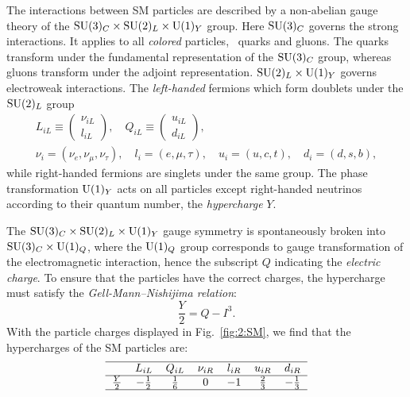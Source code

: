 The interactions between \acs{SM} particles are described by a non-abelian gauge theory of the $\mathrm{SU}(3)_C \times \mathrm{SU}(2)_L \times \mathrm{U}(1)_Y$ group. Here $\mathrm{SU}(3)_C$ governs the strong interactions. It applies to all \textit{colored} particles, \ie~quarks and gluons. The quarks transform under the fundamental representation of the $\mathrm{SU}(3)_C$ group, whereas gluons transform under the adjoint representation. $\mathrm{SU}(2)_L \times \mathrm{U}(1)_Y$ governs electroweak interactions. The \textit{left-handed} fermions which form doublets under the $\mathrm{SU}(2)_L$ group
\begin{equation}
\begin{gathered}
L_{iL} \equiv \begin{pmatrix}
\nu_{iL} \\
l_{iL}
\end{pmatrix}, \quad Q_{iL} \equiv \begin{pmatrix}
u_{iL} \\
d_{iL}
\end{pmatrix}, \\
\nu_i = \left( \nu_e, \nu_\mu, \nu_\tau \right),\quad  l_i = \left( e, \mu, \tau \right),\quad u_i = \left(u, c, t \right),\quad d_i = \left(d, s, b \right),
\end{gathered}
\end{equation}
while right-handed fermions are singlets under the same group. The phase transformation $\mathrm{U}(1)_Y$ acts on all particles except right-handed neutrinos according to their quantum number, the \textit{hypercharge} $Y$.

The $\mathrm{SU}(3)_C \times \mathrm{SU}(2)_L \times \mathrm{U}(1)_Y$ gauge symmetry is spontaneously broken into $\mathrm{SU}(3)_C \times \mathrm{U}(1)_Q$, where the $\mathrm{U}(1)_Q$ group corresponds to gauge transformation of the electromagnetic interaction, hence the subscript $Q$ indicating the \textit{electric charge}. To ensure that the particles have the correct charges, the hypercharge must satisfy the \textit{Gell-Mann--Nishijima relation}:
\begin{equation}
\frac{Y}{2} = Q - I^3.
\end{equation}
With the particle charges displayed in Fig.~\ref{fig:2:SM}, we find that the hypercharges of the \acs{SM} particles are:
\begin{equation*}
\begin{tabular}{ccccccc}
  \hline
                & $L_{iL}$ & $Q_{iL}$ & $\nu_{iR}$ & $l_{iR}$ & $u_{iR}$ & $d_{iR}$ \\ \hline
  $\frac{Y}{2}$ & $-\frac{1}{2}$ & $\frac{1}{6}$ & $0$ & $-1$ & $\frac{2}{3}$ & $-\frac{1}{3}$ \\ \hline
\end{tabular}
\end{equation*}

